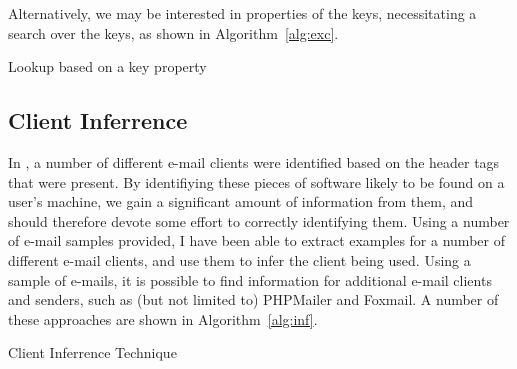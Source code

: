 Alternatively, we may be interested in properties of the keys, necessitating a search over the keys, as shown in Algorithm~\ref{alg:exc}.

\begin{algorithm}
	\caption{Lookup based on a key property}
	\label{alg:exc}
\end{algorithm}

\subsection{Client Inferrence}

In \cite{nurse2015investigating}, a number of different e-mail clients were identified based on the header tags that were present. By identifiying these pieces of software likely to be found on a user's machine, we gain a significant amount of information from them, and should therefore devote some effort to correctly identifying them.  Using a number of e-mail samples provided, I have been able to extract examples for a number of different e-mail clients, and use them to infer the client being used.  Using a sample of e-mails, it is possible to find information for additional e-mail clients and senders, such as (but not limited to) PHPMailer and Foxmail.  A number of these approaches are shown in Algorithm~\ref{alg:inf}.

\begin{algorithm}
	\caption{Client Inferrence Technique}
	\label{alg:inf}
\end{algorithm}


